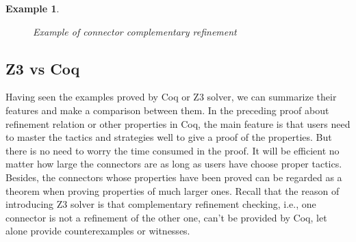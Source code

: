 \documentclass[3p,times]{elsarticle}
\newtheorem{example}{Example}[section]
\begin{document}
\begin{example}
\begin{figure}
\caption{Example of connector complementary refinement }
\label{fig:large}
\end{figure}
\end{example}
\subsection{Z3 vs Coq}
Having seen the examples proved by Coq or Z3 solver, we can summarize their features and make a comparison between them.
In the preceding proof about refinement relation or other properties in Coq, the main feature is that users need to master the tactics and strategies well to give a proof of the properties. But there is no need to worry the time consumed in the proof. It will be efficient no matter how large the connectors are as long as users have choose proper tactics. Besides, the connectors whose properties have been proved can be regarded as a theorem when proving properties of much larger ones. Recall that the reason of introducing Z3 solver is that complementary refinement checking, i.e., one connector is not  a refinement of the other one, can't be provided by Coq, let alone provide counterexamples or witnesses.
\end{document}
